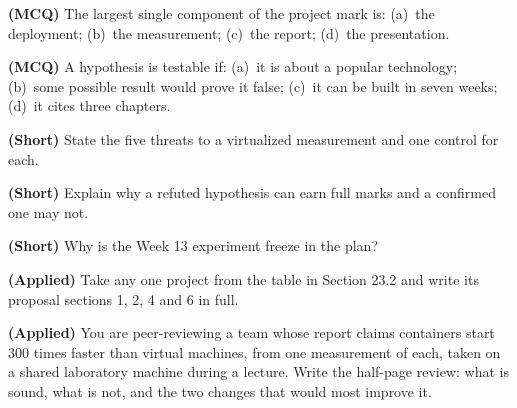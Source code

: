 \begin{reviewq}
  \item \textbf{(MCQ)} The largest single component of the project mark is:
        (a)~the deployment; (b)~the measurement; (c)~the report;
        (d)~the presentation.
  \item \textbf{(MCQ)} A hypothesis is testable if: (a)~it is about a popular
        technology; (b)~some possible result would prove it false; (c)~it can
        be built in seven weeks; (d)~it cites three chapters.
  \item \textbf{(Short)} State the five threats to a virtualized measurement
        and one control for each.
  \item \textbf{(Short)} Explain why a refuted hypothesis can earn full marks
        and a confirmed one may not.
  \item \textbf{(Short)} Why is the Week 13 experiment freeze in the plan?
  \item \textbf{(Applied)} Take any one project from the table in Section 23.2
        and write its proposal sections 1, 2, 4 and 6 in full.
  \item \textbf{(Applied)} You are peer-reviewing a team whose report claims
        containers start 300 times faster than virtual machines, from one
        measurement of each, taken on a shared laboratory machine during a
        lecture. Write the half-page review: what is sound, what is not, and
        the two changes that would most improve it.
\end{reviewq}
